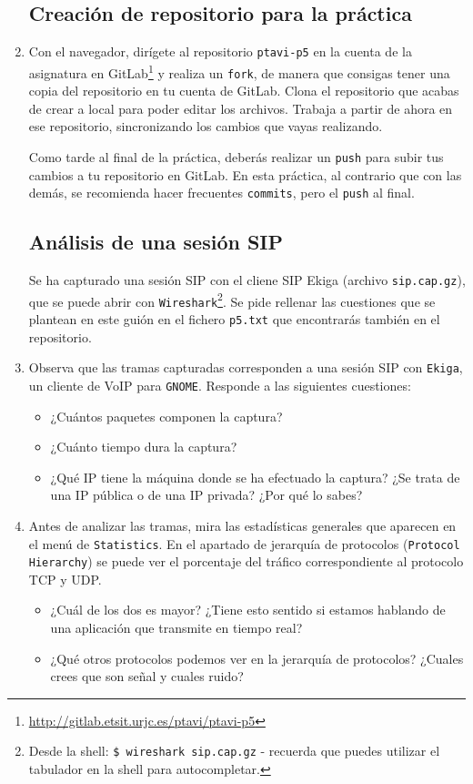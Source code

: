 \documentclass[11pt,a4paper]{article}
\begin{document}
\begin{enumerate}

\subsection*{Creación de repositorio para la práctica}

  \item Con el navegador, dirígete al repositorio \texttt{ptavi-p5} en la cuenta de la asignatura en GitLab\footnote{\url{http://gitlab.etsit.urjc.es/ptavi/ptavi-p5}} y realiza un \texttt{fork}, de manera que consigas tener una copia del repositorio en tu cuenta de GitLab. Clona el repositorio que acabas de crear a local para poder editar los archivos. Trabaja a partir de ahora en ese repositorio, sincronizando los cambios que vayas realizando.

  Como tarde al final de la práctica, deberás realizar un \texttt{push} para subir tus cambios a tu repositorio en GitLab. En esta práctica, al contrario que con las demás, se recomienda hacer frecuentes \texttt{commits}, pero el \texttt{push} al final.


\subsection*{Análisis de una sesión SIP}

Se ha capturado una sesión SIP con el cliene SIP Ekiga (archivo \texttt{sip.cap.gz}), que se puede abrir con \texttt{Wireshark}\footnote{Desde la shell: \texttt{\$ wireshark sip.cap.gz} - recuerda que puedes utilizar el tabulador en la shell para autocompletar.}. Se pide rellenar las cuestiones que se plantean en este guión en el fichero \texttt{p5.txt} que encontrarás también en el repositorio. 

  \item Observa que las tramas capturadas corresponden a una sesión SIP con \texttt{Ekiga}, un cliente de VoIP para \texttt{GNOME}. Responde a las siguientes cuestiones:
  \begin{itemize}
    \item ¿Cuántos paquetes componen la captura?
    \item ¿Cuánto tiempo dura la captura?
    \item ¿Qué IP tiene la máquina donde se ha efectuado la captura? ¿Se trata de una IP pública o de una IP privada? ¿Por qué lo sabes?
  \end{itemize}

  \item Antes de analizar las tramas, mira las estadísticas generales que aparecen en el menú de \texttt{Statistics}. En el apartado de jerarquía de protocolos (\texttt{Protocol Hierarchy}) se puede ver el porcentaje del tráfico correspondiente al protocolo TCP y UDP.
  \begin{itemize}
    \item ¿Cuál de los dos es mayor? ¿Tiene esto sentido si estamos hablando de una aplicación que transmite en tiempo real? 
    \item ¿Qué otros protocolos podemos ver en la jerarquía de protocolos? ¿Cuales crees que son señal y cuales ruido?
  \end{itemize}


\end{enumerate}
\end{document}
